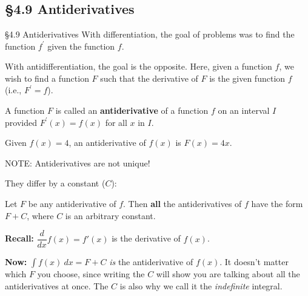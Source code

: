 \documentclass[cal1spr16Lectures.tex]{subfiles}
\begin{document}
\section[]{}

\subsection[4.9 Antiderivatives]{\S 4.9 Antiderivatives}

\begin{frame}{\S 4.9 Antiderivatives}\small
With differentiation, the goal of problems was to find the function $f^{\prime}$ given the function $f$.

\vspace{1pc}
With antidifferentiation, the goal is the opposite.  Here, given a function $f$, we wish to find a function $F$ such that the derivative of $F$ is the given function $f$ (i.e., $F^{\prime}=f$).
\end{frame}

\begin{frame}\small
\begin{dfn} A function $F$ is called an {\bf antiderivative} of a function $f$ on an interval $I$ provided $F^{\prime}(x)=f(x)$ for all $x$ in $I$. \end{dfn}

\vspace{1pc}
\begin{ex} Given $f(x)=4$, an antiderivative of $f(x)$ is $F(x)=4x$.  \end{ex}

NOTE: Antiderivatives are not unique!
\end{frame}

\begin{frame}\footnotesize
They differ by a constant ($C$):

\begin{thm}
Let $F$ be any antiderivative of $f$.  Then {\bf all} the antiderivatives of $f$ have the form $F+C$, where $C$ is an arbitrary constant.
\end{thm}

\vspace{1pc}
{\bf Recall:} $\dfrac{d}{dx} f(x)=f'(x)$ is the derivative of $f(x)$. 

\vspace{1pc}
{\bf Now:} $\int f(x)\ dx=F+C$ \alert{\it is} the antiderivative of $f(x)$.  It doesn't matter which $F$ you choose, since writing the $C$ will show you are talking about all the antiderivatives at once.  The $C$ is also why we call it the {\it indefinite} integral.
\end{frame}
\end{document}
